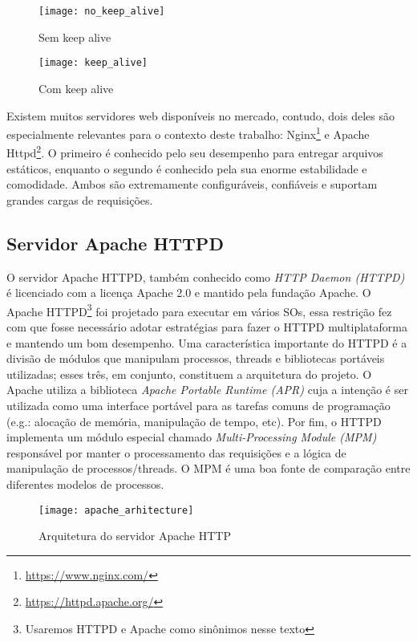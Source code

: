 \begin{figure}[!h]
  \centering
  \texttt{[image: no\_keep\_alive]}
  \caption{Sem keep alive}
  \label{fig:no_keep_alive}
\end{figure}

\begin{figure}[!h]
  \texttt{[image: keep\_alive]}
  \caption{Com keep alive}
  \label{fig:keep_alive}
\end{figure}

Existem muitos servidores web disponíveis no mercado, contudo, dois deles são
especialmente relevantes para o contexto deste trabalho:
Nginx\footnote{\url{https://www.nginx.com/}} e Apache
Httpd\footnote{\url{https://httpd.apache.org/}}.  O primeiro é conhecido pelo
seu desempenho para entregar arquivos estáticos, enquanto o segundo é conhecido
pela sua enorme estabilidade e comodidade. Ambos são extremamente
configuráveis, confiáveis e suportam grandes cargas de requisições.

\subsection{Servidor Apache HTTPD}
\label{sec:architecture}

O servidor Apache HTTPD, também conhecido como \textit{HTTP Daemon (HTTPD)} é
licenciado com a licença Apache 2.0 e mantido pela fundação Apache.  O Apache
HTTPD\footnote{Usaremos HTTPD e Apache como sinônimos nesse texto} foi
projetado para executar em vários SOs, essa restrição fez com que fosse
necessário adotar estratégias para fazer o HTTPD multiplataforma e mantendo um
bom desempenho.  Uma característica importante do HTTPD é a divisão de módulos
que manipulam processos, threads e bibliotecas portáveis utilizadas; esses
três, em conjunto, constituem a arquitetura do projeto. O Apache utiliza
a biblioteca \textit{Apache Portable Runtime (APR)} cuja a intenção é ser
utilizada como uma interface portável para as tarefas comuns de programação
(e.g.: alocação de memória, manipulação de tempo, etc). Por fim, o HTTPD
implementa um módulo especial chamado \textit{Multi-Processing Module (MPM)}
responsável por manter o processamento das requisições e a lógica de
manipulação de processos/threads. O MPM é uma boa fonte de comparação entre
diferentes modelos de processos.

\begin{figure}[!h]
  \centering
  \texttt{[image: apache\_arhitecture]} 
  \caption{Arquitetura do servidor Apache HTTP \citep{apache_module_book}}
  \label{fig:apache_architecture} 
\end{figure}

